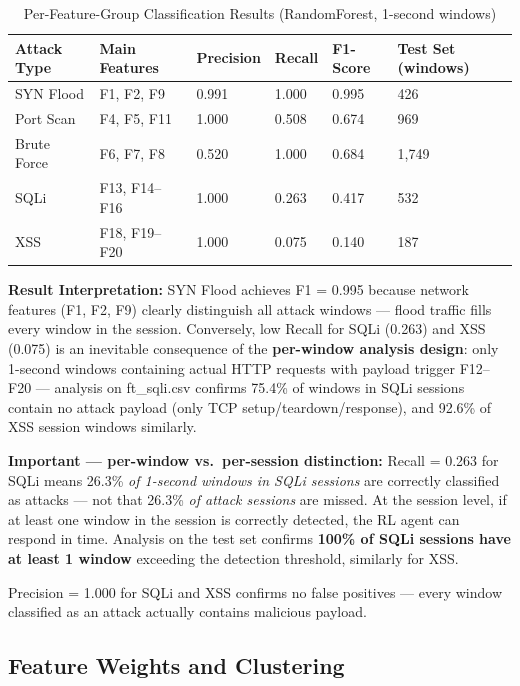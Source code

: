 \documentclass[12pt,a4paper]{report}
\begin{document}
\begin{table}[h!]
\centering
\caption{Per-Feature-Group Classification Results (RandomForest, 1-second windows)}
\begin{tabular}{L{2.5cm} L{2.5cm} C{1.8cm} C{1.5cm} C{1.5cm} C{2.5cm}}
\toprule
\textbf{Attack Type} & \textbf{Main Features} & \textbf{Precision} & \textbf{Recall} & \textbf{F1-Score} & \textbf{Test Set (windows)} \\
\midrule
SYN Flood & F1, F2, F9 & 0.991 & 1.000 & 0.995 & 426 \\
Port Scan & F4, F5, F11 & 1.000 & 0.508 & 0.674 & 969 \\
Brute Force & F6, F7, F8 & 0.520 & 1.000 & 0.684 & 1,749 \\
SQLi & F13, F14--F16 & 1.000 & 0.263 & 0.417 & 532 \\
XSS & F18, F19--F20 & 1.000 & 0.075 & 0.140 & 187 \\
\bottomrule
\end{tabular}
\end{table}

\textbf{Result Interpretation:} SYN Flood achieves F1 = 0.995 because network features (F1, F2, F9) clearly distinguish all attack windows --- flood traffic fills every window in the session. Conversely, low Recall for SQLi (0.263) and XSS (0.075) is an inevitable consequence of the \textbf{per-window analysis design}: only 1-second windows containing actual HTTP requests with payload trigger F12--F20 --- analysis on ft\_sqli.csv confirms 75.4\% of windows in SQLi sessions contain no attack payload (only TCP setup/teardown/response), and 92.6\% of XSS session windows similarly.

\textbf{Important --- per-window vs.\ per-session distinction:} Recall = 0.263 for SQLi means 26.3\% \textit{of 1-second windows in SQLi sessions} are correctly classified as attacks --- not that 26.3\% \textit{of attack sessions} are missed. At the session level, if at least one window in the session is correctly detected, the RL agent can respond in time. Analysis on the test set confirms \textbf{100\% of SQLi sessions have at least 1 window} exceeding the detection threshold, similarly for XSS.

Precision = 1.000 for SQLi and XSS confirms no false positives --- every window classified as an attack actually contains malicious payload.

\subsection{Feature Weights and Clustering}
\end{document}
